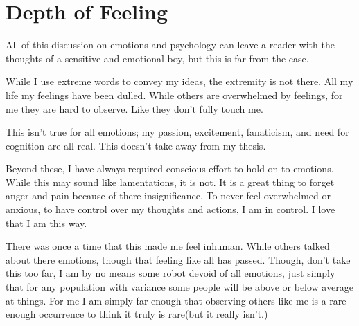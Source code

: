 \section{Depth of Feeling}
\par All of this discussion on emotions and psychology can leave a reader with the thoughts of a sensitive and emotional boy, but this is far from the case. 
\par While I use extreme words to convey my ideas, the extremity is not there. All my life my feelings have been dulled. While others are overwhelmed by feelings, for me they are hard to observe. Like they don't fully touch me. 
\par This isn't true for all emotions; my passion, excitement, fanaticism, and need for cognition are all real. This doesn't take away from my thesis. 
\par Beyond these, I have always required conscious effort to hold on to emotions. While this may sound like lamentations, it is not. It is a great thing to forget anger and pain because of there insignificance. To never feel overwhelmed or anxious, to have control over my thoughts and actions, I am in control. I love that I am this way. 
\par There was once a time that this made me feel inhuman. While others talked about there emotions, though that feeling like all has passed. Though, don't take this too far, I am by no means some robot devoid of all emotions, just simply that for any population with variance some people will be above or below average at things. For me I am simply far enough that observing others like me is a rare enough occurrence to think it truly is rare(but it really isn't.)

